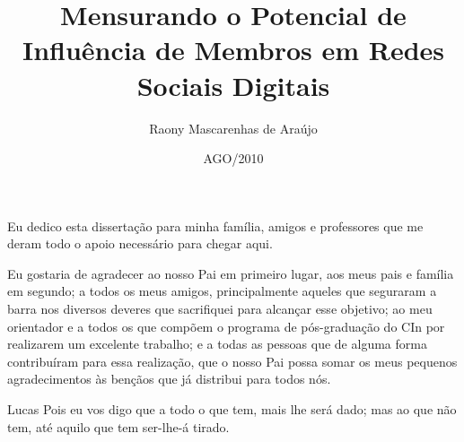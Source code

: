 \documentclass[oneside]{risethesis}
\title{Mensurando o Potencial de Influência de Membros em Redes Sociais
Digitais}
\date{AGO/2010}
\author{Raony Mascarenhas de Araújo}
\begin{document}
\newcommand{\Vt}{\ensuremath{V}}
\newcommand{\Vtp}[2]{\ensuremath{\Vt(n_#1, n_#2)}}

\newcommand{\Vd}{\ensuremath{V_d}}
\newcommand{\Vdp}[2]{\ensuremath{\Vd(n_#1, n_#2)}}

\newcommand{\Vr}{\ensuremath{V_r}}
\newcommand{\Vrp}[2]{\ensuremath{\Vr(n_#1, n_#2)}}

\newcommand{\Vtr}{\ensuremath{V_t}}
\newcommand{\Vtrp}[2]{\ensuremath{\Vtr(n_#1, n_#2)}}

\newcommand{\vd}{\ensuremath{v_d}}
\newcommand{\vdp}[3]{\ensuremath{\vd(n_#1, n_#2, l_#3)}}

\newcommand{\vr}{\ensuremath{v_r}}
\newcommand{\vrp}[3]{\ensuremath{\vr(n_#1, n_#2, l_#3)}}

\newcommand{\vtr}{\ensuremath{v_t}}
\newcommand{\vtrp}[3]{\ensuremath{\vtr(n_#1, n_#2, l_#3)}}


\frontmatter
\frontpage
\presentationpage

\begin{dedicatory}
Eu dedico esta dissertação para minha família, amigos e professores que me deram
todo o apoio necessário para chegar aqui.
\end{dedicatory}

\acknowledgements
Eu gostaria de agradecer ao nosso Pai em primeiro lugar, aos meus pais e família
em segundo; a todos os meus amigos, principalmente aqueles que seguraram a barra
nos diversos deveres que sacrifiquei para alcançar esse objetivo; ao meu
orientador e a todos os que compõem o programa de pós-graduação do CIn por
realizarem um excelente trabalho; e a todas as pessoas que de alguma forma
contribuíram para essa realização, que o nosso Pai possa somar os meus
pequenos agradecimentos às bençãos que já distribui para todos nós.

\begin{epigraph}[19:26]{Lucas}
Pois eu vos digo que a todo o que tem, mais lhe será dado; mas ao que não tem,
até aquilo que tem ser-lhe-á tirado.
\end{epigraph}

\resumo


\abstract


\tableofcontents
\listoffigures
\listoftables

\mainmatter


% 
% 










% 
\end{document}
